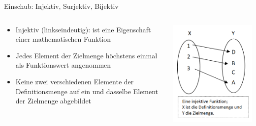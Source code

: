 \documentclass[12pt%
,aspectratio=169%
]{beamer}
\begin{document}
\begin{frame}{Einschub: Injektiv, Surjektiv, Bijektiv}
\begin{columns}[T] %
\begin{column}{.58\textwidth}
\begin{itemize}
	\item Injektiv (linkseindeutig): ist eine Eigenschaft einer mathematischen Funktion
	\item Jedes Element der Zielmenge höchstens einmal als Funktionswert angenommen
	\item Keine zwei verschiedenen Elemente der Definitionsmenge auf ein und dasselbe Element der Zielmenge abgebildet
\end{itemize}
\end{column}%
\hfill%
\begin{column}{.38\textwidth}
\centering
\includegraphics[scale=0.4]{pictures/injektiv}
\end{column}%
\end{columns}
\end{frame}
\end{document}
